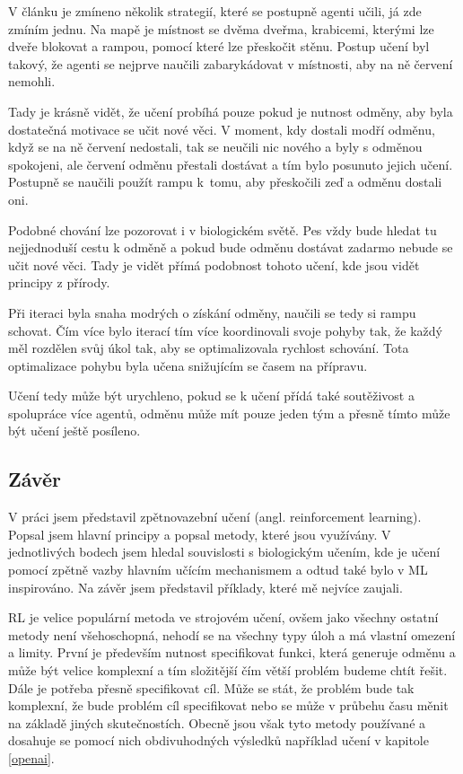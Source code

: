 \documentclass{article}
\begin{document}
V článku je zmíneno několik strategií, které se postupně agenti učili, já zde zmíním jednu. Na mapě je místnost se dvěma dveřma, krabicemi, kterými lze dveře blokovat a rampou, pomocí které lze přeskočit stěnu. Postup učení byl takový, že agenti se nejprve naučili zabarykádovat v místnosti, aby na ně červení nemohli. 

Tady je krásně vidět, že učení probíhá pouze pokud je nutnost odměny, aby byla dostatečná motivace se učit nové věci. V moment, kdy dostali modří odměnu, když se na ně červení nedostali, tak se neučili nic nového a byly s  odměnou spokojeni, ale červení odměnu přestali dostávat a tím bylo posunuto jejich učení. Postupně se naučili použít rampu k~tomu, aby přeskočili zeď a odměnu dostali oni. 

Podobné chování lze pozorovat i v biologickém světě. Pes vždy bude hledat tu nejjednoduší cestu k odměně a pokud bude odměnu dostávat zadarmo nebude se učit nové věci. Tady je vidět přímá podobnost tohoto učení, kde jsou vidět principy z přírody.

Při iteraci byla snaha modrých o získání odměny, naučili se tedy si rampu schovat. Čím více bylo iterací tím více koordinovali svoje pohyby tak, že každý měl rozdělen svůj úkol tak, aby se optimalizovala rychlost schování. Tota optimalizace pohybu byla učena snižujícím se časem na přípravu.

Učení tedy může být urychleno, pokud se k učení přídá také soutěživost a spolupráce více agentů, odměnu může mít pouze jeden tým a přesně tímto může být učení ještě posíleno.

\subsection{Závěr} 

V práci jsem představil zpětnovazební učení (angl. reinforcement learning). Popsal jsem hlavní principy a popsal metody, které jsou využívány. V jednotlivých bodech jsem hledal souvislosti s biologickým učením, kde je učení pomocí zpětně vazby hlavním učícím mechanismem a odtud také bylo v ML inspirováno. Na závěr jsem představil příklady, které mě nejvíce zaujali.

RL je velice populární metoda ve strojovém učení, ovšem jako všechny ostatní metody není všehoschopná, nehodí se na všechny typy úloh a má vlastní omezení a limity. První je především nutnost specifikovat funkci, která generuje odměnu a může být velice komplexní a tím složitější čím větší problém budeme chtít řešit. Dále je potřeba přesně specifikovat cíl. Může se stát, že problém bude tak komplexní, že bude problém cíl specifikovat nebo se může v průbehu času měnit na základě jiných skutečnostích. Obecně jsou však tyto metody používané a dosahuje se pomocí nich obdivuhodných výsledků například učení v kapitole \ref{openai}. 
\end{document}
